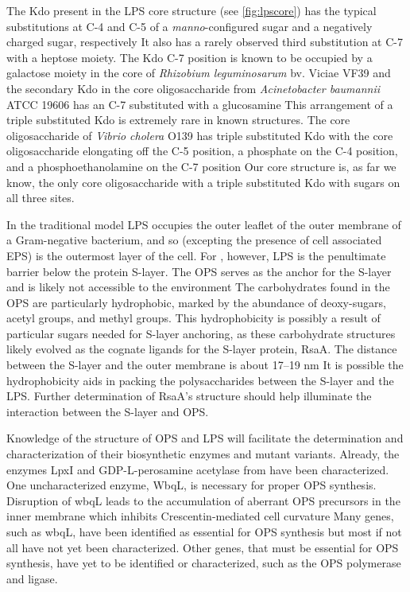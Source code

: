 The Kdo present in the \ac{LPS} core structure (see \cref{fig:lpscore}) has the typical
substitutions at C-4 and C-5 of a \textit{manno}-configured sugar and a negatively charged sugar,
respectively It also has a rarely observed third substitution at C-7 with a
heptose moiety. The Kdo C-7 position is known to be occupied by a galactose moiety in the core of
\textit{Rhizobium leguminosarum} bv. Viciae VF39 and the secondary Kdo in
the core oligosaccharide from \textit{Acinetobacter baumannii} ATCC 19606 has an C-7 substituted
with a glucosamine This arrangement of a triple
substituted Kdo is extremely rare in known structures. The core oligosaccharide
of \textit{Vibrio cholera} O139 has triple substituted Kdo with the core
oligosaccharide elongating off the C-5 position, a phosphate on the C-4
position, and a phosphoethanolamine on the C-7
position Our core structure is, as far we know,
the only core oligosaccharide with a triple substituted Kdo with sugars on all
three sites.

In the traditional model \ac{LPS} occupies the outer leaflet of the outer membrane of a
Gram-negative bacterium, and so (excepting the presence of cell associated \ac{EPS}) is the
outermost layer of the cell. For \caulobacter, however, \ac{LPS} is the penultimate barrier below
the protein \ac{S-layer}. The \caulobacter{} \ac{OPS} serves as the anchor for the S-layer and is
likely not accessible to the environment The carbohydrates found in the \ac{OPS}
are particularly hydrophobic, marked by the abundance of deoxy-sugars, acetyl groups, and methyl
groups. This hydrophobicity is possibly a result of particular sugars needed for \ac{S-layer}
anchoring, as these carbohydrate structures likely evolved as the cognate ligands for the
\ac{S-layer} protein, RsaA. The distance between the \ac{S-layer} and the outer membrane is about
17--19 nm It is possible the hydrophobicity aids in packing the polysaccharides
between the S-layer and the \ac{LPS}. Further determination of RsaA's structure should help
illuminate the interaction between the S-layer and \ac{OPS}.

Knowledge of the structure of \caulobacter{} \ac{OPS} and \ac{LPS} will facilitate the determination
and characterization of their biosynthetic enzymes and mutant variants. Already, the enzymes
LpxI and GDP-L-perosamine acetylase from
\caulobacter have been characterized. One uncharacterized enzyme, WbqL, is necessary for proper
\ac{OPS} synthesis. Disruption of wbqL leads to the accumulation of aberrant \ac{OPS} precursors in the inner membrane which inhibits Crescentin-mediated cell
curvature Many genes, such as wbqL, have been identified as
essential for \ac{OPS} synthesis but most if not all have not yet been characterized. Other genes, that must be essential for \ac{OPS} synthesis, have yet to be identified or characterized,
such as the \ac{OPS} polymerase and ligase.

